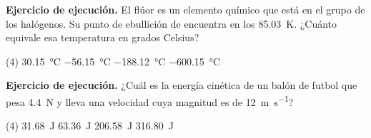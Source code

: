\documentclass[12pt, letter]{exam}
\begin{document}
\begin{questions}

    \question \label{Ejercicio_13} \textbf{Ejercicio de ejecución.} El flúor es un elemento químico que está en el grupo de los halógenos. Su punto de ebullición de encuentra en los \SI{85.03}{\kelvin}. ¿Cuánto equivale esa temperatura en grados Celsius?
    \begin{tasks}(4)
        \task \SI{30.15}{\degreeCelsius}
        \task \SI{-56.15}{\degreeCelsius}
        \task \SI{-188.12}{\degreeCelsius}
        \task \SI{-600.15}{\degreeCelsius}
    \end{tasks}
    \question \label{Ejercicio_14} \textbf{Ejercicio de ejecución.} ¿Cuál es la energía cinética de un balón de futbol que pesa \SI{4.4}{\newton} y lleva una velocidad cuya magnitud es de \SI{12}{\meter\per\second}?
    \begin{tasks}(4)
        \task \SI{31.68}{\joule}
        \task \SI{63.36}{\joule}
        \task \SI{206.58}{\joule}
        \task \SI{316.80}{\joule}
    \end{tasks}


\end{questions}
\end{document}
